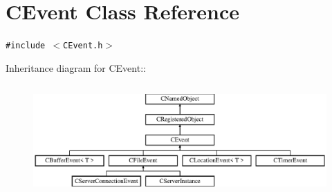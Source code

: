 \section{CEvent  Class Reference}
\label{classCEvent}
{\tt \#include $<$CEvent.h$>$}

Inheritance diagram for CEvent::\begin{figure}[H]
\begin{center}
\leavevmode
\includegraphics[height=4.26829cm]{classCEvent}
\end{center}
\end{figure}
